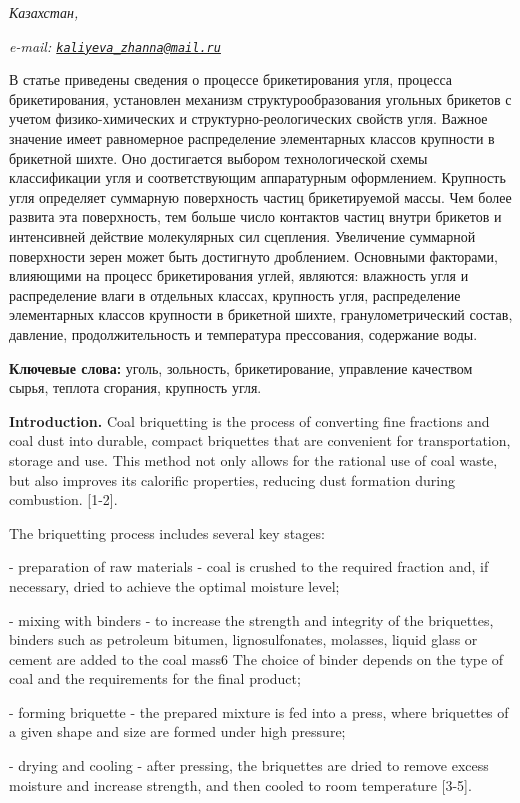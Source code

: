 \emph{Казахстан,}

\emph{e-mail:
\href{mailto:kaliyeva_zhanna@mail.ru}{\nolinkurl{kaliyeva\_zhanna@mail.ru}}}

В статье приведены сведения о процессе брикетирования угля, процесса
брикетирования, установлен механизм структурообразования угольных
брикетов с учетом физико-химических и структурно-реологических свойств
угля. Важное значение имеет равномерное распределение элементарных
классов крупности в брикетной шихте. Оно достигается выбором
технологической схемы классификации угля и соответствующим аппаратурным
оформлением. Крупность угля определяет суммарную поверхность частиц
брикетируемой массы. Чем более развита эта поверхность, тем больше число
контактов частиц внутри брикетов и интенсивней действие молекулярных сил
сцепления. Увеличение суммарной поверхности зерен может быть достигнуто
дроблением. Основными факторами, влияющими на процесс брикетирования
углей, являются: влажность угля и распределение влаги в отдельных
классах, крупность угля, распределение элементарных классов крупности в
брикетной шихте, гранулометрический состав, давление, продолжительность
и температура прессования, содержание воды.

{\bfseries Ключевые слова:} уголь, зольность, брикетирование, управление
качеством сырья, теплота сгорания, крупность угля.

{\bfseries Introduction.} Coal briquetting is the process of converting
fine fractions and coal dust into durable, compact briquettes that are
convenient for transportation, storage and use. This method not only
allows for the rational use of coal waste, but also improves its
calorific properties, reducing dust formation during combustion.
{[}1-2{]}.

The briquetting process includes several key stages:

- preparation of raw materials - coal is crushed to the required
fraction and, if necessary, dried to achieve the optimal moisture level;

- mixing with binders - to increase the strength and integrity of the
briquettes, binders such as petroleum bitumen, lignosulfonates,
molasses, liquid glass or cement are added to the coal mass6 The choice
of binder depends on the type of coal and the requirements for the final
product;

- forming briquette - the prepared mixture is fed into a press, where
briquettes of a given shape and size are formed under high pressure;

- drying and cooling - after pressing, the briquettes are dried to
remove excess moisture and increase strength, and then cooled to room
temperature {[}3-5{]}.

